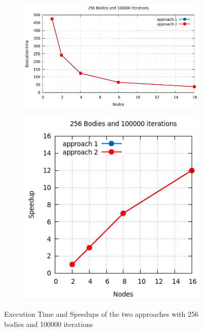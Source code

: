 \documentclass[a4paper]{article}
\begin{document}
\begin{figure}[ht]
\begin{subfigure}{.55\textwidth}
  \centering
  \includegraphics[width=1\linewidth]{results/256_100000_cmp}
\end{subfigure} %
\begin{subfigure}{.35\textwidth}
  \centering
  \includegraphics[width=1\linewidth]{results/256_100000_cmp_sp}
\end{subfigure} 
  \caption{Execution Time and Speedups of the two approaches with 256 bodies and 100000 iterations}
  \label{fig:G1}
\end{figure}
\FloatBarrier
\end{document}
